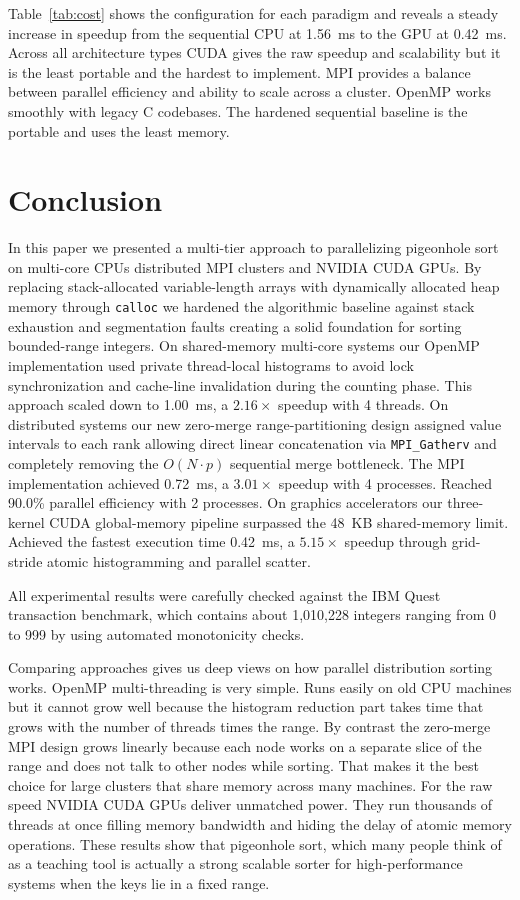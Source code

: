 \documentclass[conference]{IEEEtran}
\begin{document}
Table~\ref{tab:cost} shows the configuration for each paradigm and reveals a steady increase in speedup from the sequential CPU at 1.56~ms to the GPU at 0.42~ms. Across all architecture types CUDA gives the raw speedup and scalability but it is the least portable and the hardest to implement. MPI provides a balance between parallel efficiency and ability to scale across a cluster. OpenMP works smoothly with legacy C codebases. The hardened sequential baseline is the portable and uses the least memory.

\section{Conclusion}
In this paper we presented a multi-tier approach to parallelizing pigeonhole sort on multi-core CPUs distributed MPI clusters and NVIDIA CUDA GPUs. By replacing stack-allocated variable-length arrays with dynamically allocated heap memory through \texttt{calloc} we hardened the algorithmic baseline against stack exhaustion and segmentation faults creating a solid foundation for sorting bounded-range integers. On shared-memory multi-core systems our OpenMP implementation used private thread-local histograms to avoid lock synchronization and cache-line invalidation during the counting phase. This approach scaled down to 1.00~ms, a $2.16\times$ speedup with 4 threads. On distributed systems our new zero-merge range-partitioning design assigned value intervals to each rank allowing direct linear concatenation via \texttt{MPI\_Gatherv} and completely removing the $O(N \cdot p)$ sequential merge bottleneck. The MPI implementation achieved 0.72~ms, a $3.01\times$ speedup with 4 processes. Reached 90.0\% parallel efficiency with 2 processes. On graphics accelerators our three-kernel CUDA global-memory pipeline surpassed the 48~KB shared-memory limit. Achieved the fastest execution time 0.42~ms, a $5.15\times$ speedup through grid-stride atomic histogramming and parallel scatter.

All experimental results were carefully checked against the IBM Quest transaction benchmark, which contains about 1,010,228 integers ranging from 0 to 999 by using automated monotonicity checks.

Comparing approaches gives us deep views on how parallel distribution sorting works. OpenMP multi-threading is very simple. Runs easily on old CPU machines but it cannot grow well because the histogram reduction part takes time that grows with the number of threads times the range. By contrast the zero-merge MPI design grows linearly because each node works on a separate slice of the range and does not talk to other nodes while sorting. That makes it the best choice for large clusters that share memory across many machines. For the raw speed NVIDIA CUDA GPUs deliver unmatched power. They run thousands of threads at once filling memory bandwidth and hiding the delay of atomic memory operations. These results show that pigeonhole sort, which many people think of as a teaching tool is actually a strong scalable sorter for high-performance systems when the keys lie in a fixed range.
\end{document}

